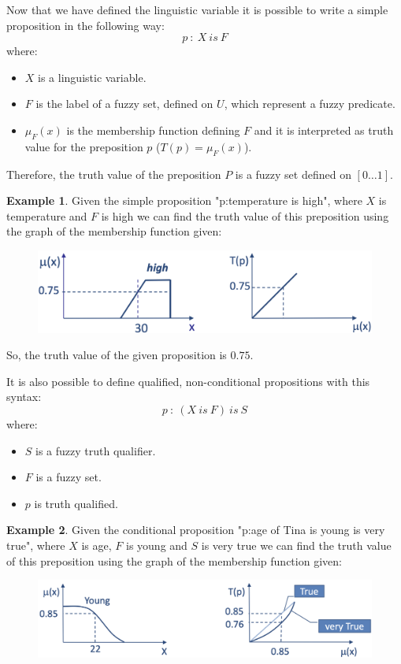 \documentclass[12pt, a4paper]{report}
\theoremstyle{remark}
\theoremstyle{definition}
\newtheorem{example}{Example}
\begin{document}
    Now that we have defined the linguistic variable it is possible to write a simple proposition in the following way: 
    \[p\: : \: X \: is \: F\]
    where:
    \begin{itemize}
        \item $X$ is a linguistic variable.
        \item $F$ is the label of a fuzzy set, defined on $U$, which represent a fuzzy predicate.
        \item $\mu_F(x)$ is the membership function defining $F$ and it is interpreted as truth value for the preposition $p$ ($T(p)=\mu_F(x)$).
    \end{itemize}
    Therefore, the truth value of the preposition $P$ is a fuzzy set defined on $[0 \dots 1]$.
    \begin{example}
        Given the simple proposition "p:temperature is high", where $X$ is temperature and $F$ is high we can find the truth value of this 
        preposition using the graph of the membership function given:
        \begin{figure}[H]
            \centering
            \includegraphics[width=0.5\linewidth]{images/temperature.png}
        \end{figure}
        So, the truth value of the given proposition is $0.75$.
    \end{example}

    It is also possible to define qualified, non-conditional propositions with this syntax: 
    \[p \: : \: (X \: is \: F) \: is \: S\]
    where:
    \begin{itemize}
        \item $S$ is a fuzzy truth qualifier.
        \item $F$ is a fuzzy set.
        \item $p$ is truth qualified.
    \end{itemize}
    \begin{example}
        Given the conditional proposition "p:age of Tina is young is very true", where $X$ is age, $F$ is young and $S$ is very true we can 
        find the truth value of this preposition using the graph of the membership function given:
        \begin{figure}[H]
            \centering
            \includegraphics[width=0.75\linewidth]{images/age.png}
        \end{figure}
    \end{example}
\end{document}
